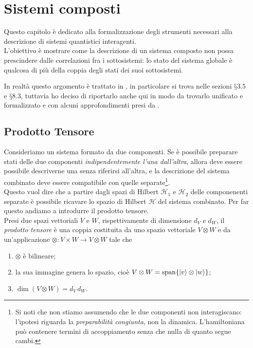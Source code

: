 \chapter{Sistemi composti}

Questo capitolo è dedicato alla formalizzazione degli strumenti necessari alla descrizione di sistemi quantistici interagenti. \\
L'obiettivo è mostrare come la descrizione di un sistema composto non possa prescindere dalle correlazioni fra i sottosistemi: lo stato del sistema globale è qualcosa di più della coppia degli stati dei suoi sottosistemi.

In realtà questo argomento è trattato in \cite{Ballentine}, in particolare si trova nelle sezioni $§3.5$ e $§8.3$, tuttavia ho deciso di riportarlo anche qui in modo da trovarlo unificato e formalizzato e con alcuni approfondimenti presi da \cite{NielsenChuang}. \\

\section{Prodotto Tensore}

Consideriamo un sistema formato da due componenti. Se è possibile preparare stati delle due componenti \emph{indipendentemente l'una dall'altra}, allora deve essere possibile descriverne una senza riferirsi all'altra, e la descrizione del sistema combinato deve essere compatibile con quelle separate\footnote{Si noti che non stiamo assumendo che le due componenti non interagiscano: l'ipotesi riguarda la \emph{preparabilità congiunta}, non la dinamica. L'hamiltoniana può contenere termini di accoppiamento senza che nulla di quanto segue cambi.}.\\
Questo vuol dire che a partire dagli spazi di Hilbert $\mathcal{H}_1$ e $\mathcal{H}_2$ delle componenenti separate è possibile ricavare lo spazio di Hilbert $\mathcal{H}$ del sistema combinato. Per far questo andiamo a introdurre il prodotto tensore. \\

Presi due spazi vettoriali $V$ e $W$, rispettivamente di dimensione $d_V$ e $d_W$, il \emph{prodotto tensore} è una coppia costituita da uno spazio vettoriale $V \otimes W$ e da un'applicazione $\otimes : V \times W \to V \otimes W$ tale che

\begin{enumerate}
    \item $\otimes$ è bilineare;
    \item la sua immagine genera lo spazio, cioè $V \otimes W = \operatorname{span}\{\ket{v} \otimes \ket{w}\}$;
    \item $\dim (V \otimes W) = d_V \, d_W$.
\end{enumerate}

